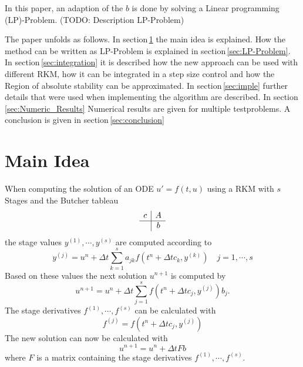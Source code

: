 \documentclass[a4paper]{scrartcl}
\numberwithin{equation}{section}
\theoremstyle{plain}
\theoremstyle{definition}
\numberwithin{theorem}{section}
\newcommand{\dt}{{\Delta t}}
\newcommand{\1}{\mathbbm{1}}
\begin{document}
In this paper, an adaption of the $b$ is done by solving a Linear programming (LP)-Problem.
(TODO: Description LP-Problem)

The paper unfolds as follows. In section\,\ref{sec:main_idea} the main idea is explained. How the method can be written as LP-Problem is explained in section\,\ref{sec:LP-Problem}.
In section\,\ref{sec:integration} it is described how the new approach can be used with different RKM, how it can be integrated in a step size control and how the Region of absolute stability can be approximated.  
In section\,\ref{sec:imple} further details that were used when implementing the algorithm are described.
In section\,\ref{sec:Numeric_Results} Numerical results are given for multiple testproblems.
A conclusion is given in section\,\ref{sec:conclusion}  



\section{Main Idea}\label{sec:main_idea}

When computing the solution of an ODE $u ' = f(t,u) $ using a RKM with $s$ Stages and the Butcher tableau
\begin{align}
\begin{array}{c|c}
c &  A \\
\hline
 & b\\
\end{array}
\end{align}
the stage values $y^{(1)},\cdots,y^{(s)}$ are computed according to
\begin{equation}
y^{(j)} =  u^n + \dt \sum_{k = 1}^{s} a_{jk} f(t^n + \dt c_k,y^{(k)})  \quad j = 1,\cdots,s
\end{equation}
Based on these values the next solution $u^{n+1}$ is computed by
\begin{equation}
u^{n+1} = u^n + \dt \sum_{j  = 1}^s f(t^n + \dt c_j,y^{(j)}) b_j .
\end{equation}
The stage derivatives $f^{(1)},\cdots,f^{(s)}$ can be calculated with
\begin{equation}
f^{(j)} = f(t^n + \dt c_j,y^{(j)})
\end{equation}
The new solution can now be calculated with
\begin{equation}\label{eq:Combination}
u^{n+1} = u^n + \dt F b
\end{equation}
where $F$ is a matrix containing the stage derivatives $f^{(1)},\cdots,f^{(s)}$.
\end{document}
